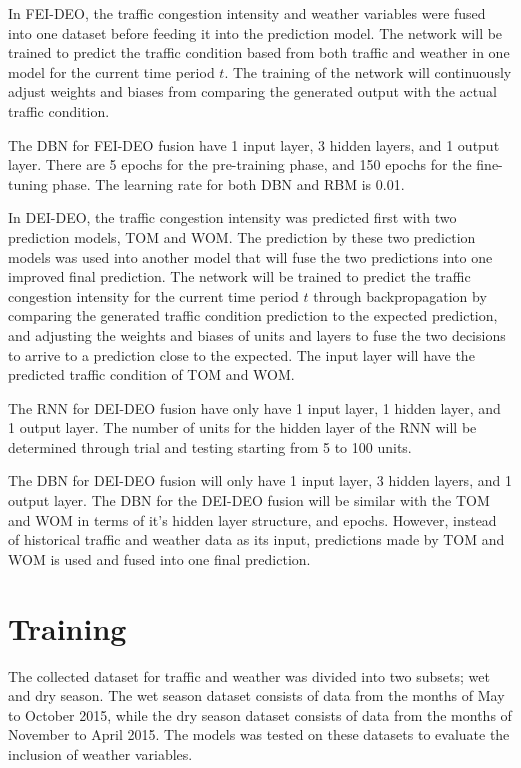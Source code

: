 In FEI-DEO, the traffic congestion intensity and weather variables were fused into one dataset before feeding it into the prediction model. The network will be trained to predict the traffic condition based from both traffic and weather in one model for the current time period $t$. The training of the network will continuously adjust weights and biases from comparing the generated output with the actual traffic condition. 

The DBN for FEI-DEO fusion have 1 input layer, 3 hidden layers, and 1 output layer. There are 5 epochs for the pre-training phase, and 150 epochs for the fine-tuning phase. The learning rate for both DBN and RBM is 0.01. 

In DEI-DEO, the traffic congestion intensity was predicted first with two prediction models, TOM and WOM. The prediction by these two prediction models was used into another model that will fuse the two predictions into one improved final prediction. The network will be trained to predict the traffic congestion intensity for the current time period $t$ through backpropagation by comparing the generated traffic condition prediction to the expected prediction, and adjusting the weights and biases of units and layers to fuse the two decisions to arrive to a prediction close to the expected. The input layer will have the predicted traffic condition of TOM and WOM. 

The RNN for DEI-DEO fusion have only have 1 input layer, 1 hidden layer, and 1 output layer. The number of units for the hidden layer of the RNN will be determined through trial and testing starting from 5 to 100 units. 

The DBN for DEI-DEO fusion will only have 1 input layer, 3 hidden layers, and 1 output layer. The DBN for the DEI-DEO fusion will be similar with the TOM and WOM in terms of it’s hidden layer structure, and epochs. However, instead of historical traffic and weather data as its input, predictions made by TOM and WOM is used and fused into one final prediction. 

\section{Training}
The collected dataset for traffic and weather was divided into two subsets; wet and dry season. The wet season dataset consists of data from the months of May to October 2015, while the dry season dataset consists of data from the months of November to April 2015. The models was tested on these datasets to evaluate the inclusion of weather variables. 

